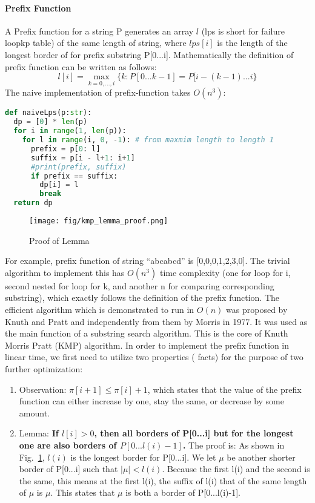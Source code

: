 \documentclass[../main.tex]{subfiles}
\begin{document}
\paragraph{Prefix Function} A Prefix function for a string P generates an array $l$ (lps is short for failure loopkp table) of the same length of string, where $lps[i]$ is the length of the longest border of for prefix substring P[0...i]. Mathematically the definition of prefix function can be written as follows:
\begin{equation}
    l[i] = \max_{k=0,...,i}\{k: P[0...k-1] = P[i-(k-1)...i\}
\end{equation}
The naive implementation of prefix-function takes $O(n^3)$:
\begin{lstlisting}[language=Python]
def naiveLps(p:str):
  dp = [0] * len(p)
  for i in range(1, len(p)):
    for l in range(i, 0, -1): # from maxmim length to length 1
      prefix = p[0: l]
      suffix = p[i - l+1: i+1]
      #print(prefix, suffix)
      if prefix == suffix:
        dp[i] = l
        break
  return dp
\end{lstlisting}
\begin{figure}[h]
    \centering
    \texttt{[image: fig/kmp\_lemma\_proof.png]}
    \caption{Proof of Lemma}
    \label{fig:proof_border_property}
\end{figure}

For example, prefix function of string ``abcabcd'' is [0,0,0,1,2,3,0]. The trivial algorithm to implement this has $O(n^3)$ time complexity (one for loop for i, second nested for loop for k, and another n for comparing corresponding substring), which exactly follows the definition of the prefix function.  The efficient algorithm which is demonstrated to run in $O(n)$ was proposed by Knuth and Pratt and independently from them by Morris in 1977. It was used as the main function of a substring search algorithm. This is the core of Knuth Morris Pratt (KMP) algorithm. In order to implement the prefix function in linear time, we first need to utilize two properties ( facts) for the purpose of two further optimization:
\begin{enumerate}
    \item \label{observation_1} Observation: $\pi[i+1] \leq \pi[i] + 1$, which states that the value of the prefix function can either increase by one, stay the same, or decrease by some amount.
    \item \label{Lemma_1} Lemma: \textbf{If $l[i] > 0$, then all borders of P[0...i] but for the longest one are also borders of $P[0...l(i)-1]$.} The proof is: As shown in Fig.~\ref{fig:proof_border_property}, $l(i)$ is the longest border for P[0...i]. We let $\mu$ be another shorter border of P[0...i] such that $|\mu| < l(i) $. Because the first l(i) and the second is the same, this means at the first l(i), the suffix of l(i) that of the same length of $\mu$ is $\mu$. This states that $\mu$ is both a border of P[0...l(i)-1].  
 
\end{enumerate}
\end{document}
